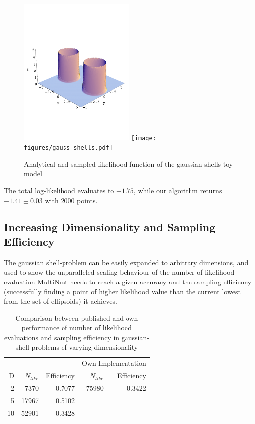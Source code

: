 \documentclass{article}
\begin{document}
\begin{figure}\label{gauss-shell}
\includegraphics[width=0.5\textwidth]{figures/gauss_shells_analytic.pdf}
\texttt{[image: figures/gauss\_shells.pdf]}
\caption{Analytical and sampled likelihood function of the gaussian-shells toy model}
\end{figure}

The total log-likelihood evaluates to $-1.75$, while our algorithm returns $-1.41\pm 0.03$  with 2000 points.

\subsection{Increasing Dimensionality and Sampling Efficiency}
The gaussian shell-problem can be easily expanded to arbitrary dimensions, and used to show the unparalleled scaling behaviour of the number of likelihood evaluation MultiNest needs to reach a given accuracy and the sampling efficiency (successfully finding a point of higher likelihood value than the current lowest from the set of ellipsoids) it achieves.
\begin{table}\label{tab:NlikeEff}
\centering
\begin{tabular}{rrrrr}
\hline
&\multicolumn{2}{c}{\cite{2009MNRAS.398.1601F}} &\multicolumn{2}{c}{Own Implementation} \\
D&$N_{like}$ & Efficiency & $N_{like}$ & Efficiency \\ \hline
 2 &  7370 & 0.7077 & 75980 & 0.3422 \\
 5 & 17967 & 0.5102 &       &        \\
10 & 52901 & 0.3428 &       &        \\ \hline
\end{tabular}
\caption{Comparison between published and own performance of number of likelihood evaluations and sampling efficiency in gaussian-shell-problems of varying dimensionality}
\end{table}
\end{document}
